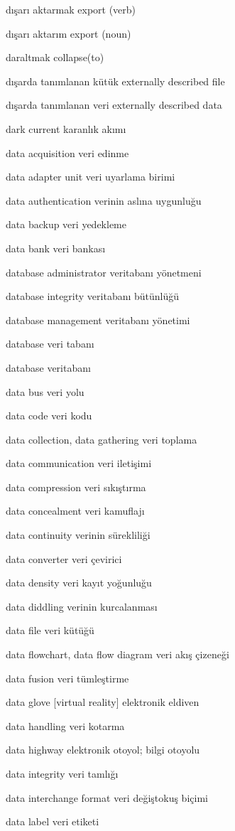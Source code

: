 \documentclass[12pt,fleqn]{article}\usepackage{../../common}
\begin{document}
dışarı aktarmak export (verb)

dışarı aktarım export (noun)

daraltmak collapse(to)

dışarda tanımlanan kütük externally described file

dışarda tanımlanan veri externally described data

dark current karanlık akımı

data acquisition veri edinme

data adapter unit veri uyarlama birimi

data authentication verinin aslına uygunluğu

data backup veri yedekleme

data bank veri bankası

database administrator veritabanı yönetmeni

database integrity veritabanı bütünlüğü

database management veritabanı yönetimi

database veri tabanı

database veritabanı

data bus veri yolu

data code veri kodu

data collection, data gathering veri toplama

data communication veri iletişimi

data compression veri sıkıştırma

data concealment veri kamuflajı

data continuity verinin sürekliliği

data converter veri çevirici

data density veri kayıt yoğunluğu

data diddling verinin kurcalanması

data file veri kütüğü

data flowchart, data flow diagram veri akış çizeneği

data fusion veri tümleştirme

data glove [virtual reality] elektronik eldiven

data handling veri kotarma

data highway elektronik otoyol; bilgi otoyolu

data integrity veri tamlığı

data interchange format veri değiştokuş biçimi

data label veri etiketi
\end{document}
